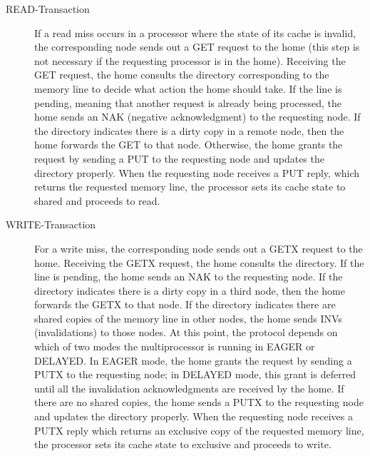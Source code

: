 \documentclass{llncs}
\begin{document}
\begin{description}
\item[READ-Transaction]
If a read miss occurs in a processor where the state of its cache is invalid, the corresponding node sends out a GET request to the
home (this step is not necessary if the requesting processor is in the home). Receiving the
GET request, the home consults the directory corresponding to the memory line to decide
what action the home should take. If the line is pending, meaning that another request
is already being processed, the home sends an NAK (negative acknowledgment) to the
requesting node. If the directory indicates there is a dirty copy in a remote node, then the
home forwards the GET to that node. Otherwise, the home grants the request by sending
a PUT to the requesting node and updates the directory properly. When the requesting
node receives a PUT reply, which returns the requested memory line, the processor sets
its cache state to shared and proceeds to read.

\item[WRITE-Transaction]
For a write miss, the corresponding node sends out a GETX request to the home.
Receiving the GETX request, the home consults the directory. If the line is pending,
the home sends an NAK to the requesting node. If the directory indicates there is a dirty
copy in a third node, then the home forwards the GETX to that node. If the directory
indicates there are shared copies of the memory line in other nodes, the home sends
INVs (invalidations) to those nodes. At this point, the protocol depends on which of two
modes the multiprocessor is running in EAGER or DELAYED. In EAGER mode, the home
grants the request by sending a PUTX to the requesting node; in DELAYED mode, this
grant is deferred until all the invalidation acknowledgments are received by the home. If
there are no shared copies, the home sends a PUTX to the requesting node and updates
the directory properly. When the requesting node receives a PUTX reply which returns
an exclusive copy of the requested memory line, the processor sets its cache state to
exclusive and proceeds to write.
\end{description}
\end{document}
